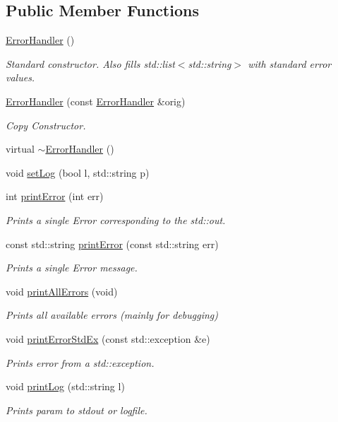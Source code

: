 \subsection*{Public Member Functions}
\begin{DoxyCompactItemize}
\item 
\mbox{\hyperlink{classErrorHandler_a7e5f379bd231442b898cef94556b2107}{Error\+Handler}} ()
\begin{DoxyCompactList}\small\item\em Standard constructor. Also fills std\+::list$<$std\+::string$>$ with standard error values. \end{DoxyCompactList}\item 
\mbox{\hyperlink{classErrorHandler_add20b373ee276ee2ef040f6dd913a86b}{Error\+Handler}} (const \mbox{\hyperlink{classErrorHandler}{Error\+Handler}} \&orig)
\begin{DoxyCompactList}\small\item\em Copy Constructor. \end{DoxyCompactList}\item 
virtual \mbox{\hyperlink{classErrorHandler_a73c7e690b864697e507aaeb537b3c3e5}{$\sim$\+Error\+Handler}} ()
\item 
void \mbox{\hyperlink{classErrorHandler_aa79cfd994939c238b85ad021ea6bbe05}{set\+Log}} (bool l, std\+::string p)
\item 
int \mbox{\hyperlink{classErrorHandler_ab90b8248f24e3129df69d224585956dd}{print\+Error}} (int err)
\begin{DoxyCompactList}\small\item\em Prints a single Error corresponding to the std\+::out. \end{DoxyCompactList}\item 
const std\+::string \mbox{\hyperlink{classErrorHandler_ad1e6aa8018e2a22460a1431e6e7d8804}{print\+Error}} (const std\+::string err)
\begin{DoxyCompactList}\small\item\em Prints a single Error message. \end{DoxyCompactList}\item 
void \mbox{\hyperlink{classErrorHandler_a1108324c221544c928a2de3a2cf9ba98}{print\+All\+Errors}} (void)
\begin{DoxyCompactList}\small\item\em Prints all available errors (mainly for debugging) \end{DoxyCompactList}\item 
void \mbox{\hyperlink{classErrorHandler_ac36e4dd6e488718e7e07b2d03adf9f37}{print\+Error\+Std\+Ex}} (const std\+::exception \&e)
\begin{DoxyCompactList}\small\item\em Prints error from a std\+::exception. \end{DoxyCompactList}\item 
void \mbox{\hyperlink{classErrorHandler_a5ef18327a559b8d77be496dad6a2bf52}{print\+Log}} (std\+::string l)
\begin{DoxyCompactList}\small\item\em Prints param to stdout or logfile. \end{DoxyCompactList}\end{DoxyCompactItemize}
